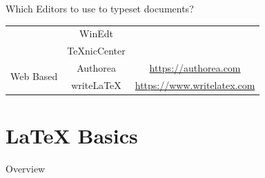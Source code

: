 \documentclass[style=lsuloni,orient=landscape]{powerdot}
\newcommand{\cmark}{\ding{51}}
\begin{document}
\begin{wideslide}[toc=]{Which Editors to use to typeset documents?}
\begin{center}
\begin{tabular}{|c|c|ccc|}
                                         & WinEdt       & \cmark  &          &        \\
                                         & TeXnicCenter & \cmark  &          &        \\
        \hline
        \multirow{2}{*}{Web Based}       & Authorea      & \multicolumn{3}{c|}{\url{https://authorea.com}}\\
                                         & write\LaTeX{} & \multicolumn{3}{c|}{\url{https://www.writelatex.com}}\\
        \hline
        \end{tabular}
    \end{center}
\end{wideslide}

\section[slide=false]{\LaTeX{} Basics}
\begin{wideslide}[toc=,bm=]{Overview}
  \tableofcontents[content=currentsection,type=0]
\end{wideslide}
\end{document}
